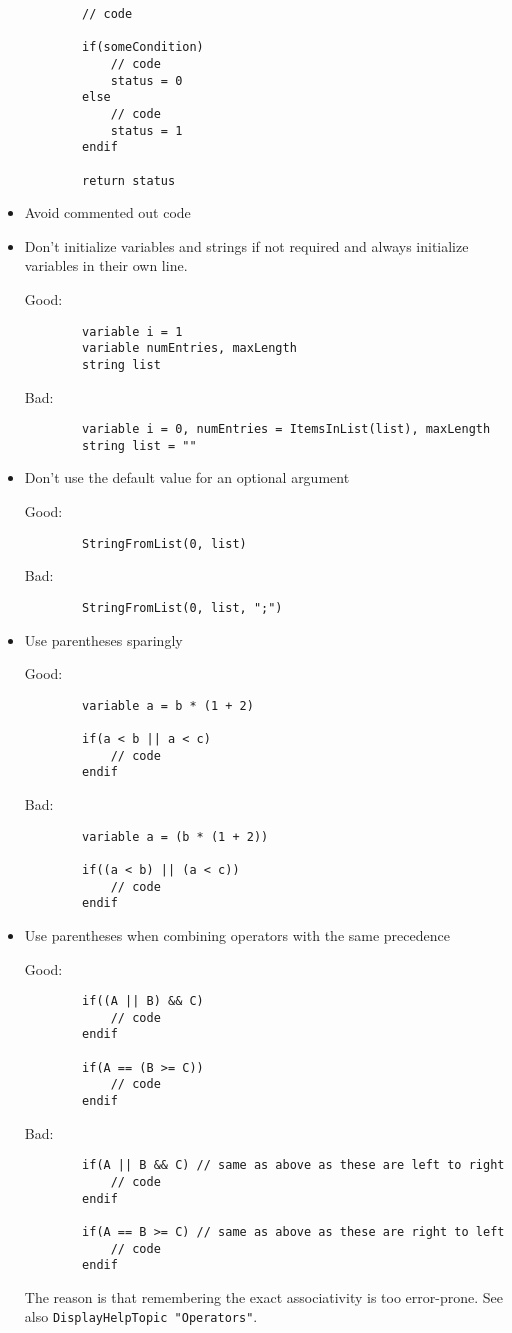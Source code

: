 \documentclass{scrartcl}
\begin{document}
\begin{itemize}
\begin{minipage}{\textwidth}
\begin{verbatim}
		// code
		
		if(someCondition)
			// code
			status = 0
		else
			// code
			status = 1
		endif
		
		return status
	\end{verbatim}
	\end{minipage}
%
	\item Avoid commented out code
%
	\item Don't initialize variables and strings if not required and always initialize variables in their own line.\par
	Good:
	\begin{verbatim}
		variable i = 1
		variable numEntries, maxLength
		string list
	\end{verbatim}
	Bad:
	\begin{verbatim}
		variable i = 0, numEntries = ItemsInList(list), maxLength
		string list = ""
	\end{verbatim}	
%
	\item Don't use the default value for an optional argument\par
	Good:
	\begin{verbatim}
		StringFromList(0, list)
	\end{verbatim}
	Bad:
	\begin{verbatim}
		StringFromList(0, list, ";")
	\end{verbatim}
%
	\item Use parentheses sparingly\par
	Good:
	\begin{verbatim}
		variable a = b * (1 + 2)
		
		if(a < b || a < c)
			// code
		endif
	\end{verbatim}
	\begin{minipage}{\textwidth}
	Bad:
	\begin{verbatim}
		variable a = (b * (1 + 2))

		if((a < b) || (a < c))
			// code
		endif
	\end{verbatim}
	\end{minipage}
	\item Use parentheses when combining operators with the same precedence\par
	Good:
	\begin{verbatim}
		if((A || B) && C)
			// code
		endif

		if(A == (B >= C))
			// code
		endif
	\end{verbatim}
	Bad:
	\begin{verbatim}
		if(A || B && C) // same as above as these are left to right
			// code
		endif

		if(A == B >= C) // same as above as these are right to left
			// code
		endif
	\end{verbatim}
	The reason is that remembering the exact associativity is too error-prone. See also \texttt{DisplayHelpTopic "Operators"}.
	\end{itemize}
\end{document}
